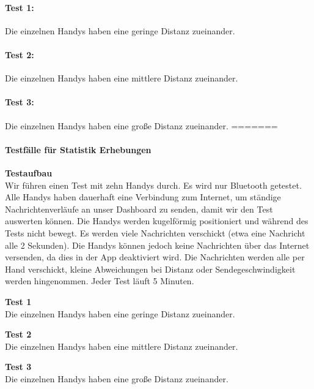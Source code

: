 \paragraph*{Test 1:}
Die einzelnen Handys haben eine geringe Distanz zueinander. 
\paragraph*{Test 2:}
Die einzelnen Handys haben eine mittlere Distanz zueinander. 
\paragraph*{Test 3:}
Die einzelnen Handys haben eine große Distanz zueinander. 
=======
\paragraph{Testfälle für Statistik Erhebungen}

\textbf{Testaufbau}\\
Wir führen einen Test mit zehn Handys durch. Es wird nur Bluetooth getestet. Alle Handys haben dauerhaft eine Verbindung zum Internet, um ständige Nachrichtenverläufe an unser Dashboard zu senden, damit wir den Test auswerten können. Die Handys werden kugelförmig positioniert und während des Tests nicht bewegt. Es werden viele Nachrichten verschickt (etwa eine Nachricht alle 2 Sekunden). Die Handys können jedoch keine Nachrichten über das Internet versenden, da dies in der App deaktiviert wird. Die Nachrichten werden alle per Hand verschickt, kleine Abweichungen bei Distanz oder Sendegeschwindigkeit werden hingenommen. Jeder Test läuft 5 Minuten.

\textbf{Test 1}\\
Die einzelnen Handys haben eine geringe Distanz zueinander.

\textbf{Test 2}\\
Die einzelnen Handys haben eine mittlere Distanz zueinander.

\textbf{Test 3}\\
Die einzelnen Handys haben eine große Distanz zueinander.
